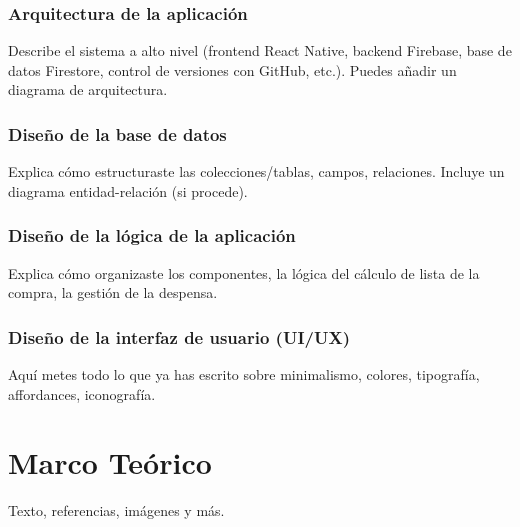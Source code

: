 \documentclass[12pt,a4paper]{report} %
\begin{document}
	
	
	\subsection*{Arquitectura de la aplicación}
	Describe el sistema a alto nivel (frontend React Native, backend Firebase, base de datos Firestore, control de versiones con GitHub, etc.).
	Puedes añadir un diagrama de arquitectura.
	
	\subsection*{Diseño de la base de datos}
	Explica cómo estructuraste las colecciones/tablas, campos, relaciones.  
	Incluye un diagrama entidad-relación (si procede).
	
	\subsection*{Diseño de la lógica de la aplicación}
	Explica cómo organizaste los componentes, la lógica del cálculo de lista de la compra, la gestión de la despensa.
	
	\subsection*{Diseño de la interfaz de usuario (UI/UX)}
	Aquí metes todo lo que ya has escrito sobre minimalismo, colores, tipografía, affordances, iconografía.
	
	
	
	
	
	\chapter{Marco Teórico}
	Texto, referencias, imágenes y más.
	
\end{document}
